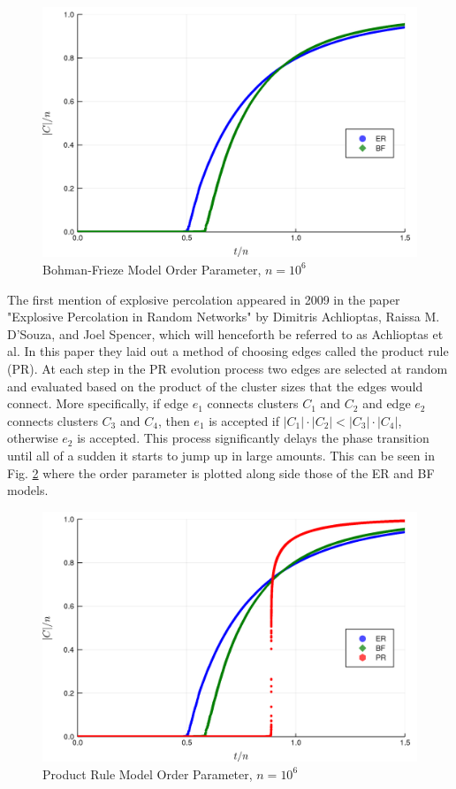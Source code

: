 \begin{figure}[H]
	\centering
	\includegraphics[width=350pt]{images/ER-BF-1e6-order-param.png}
	\caption{Bohman-Frieze Model Order Parameter, $n = 10^6$}
	\label{fig:ER_BF_transition}
\end{figure}

The first mention of explosive percolation appeared in 2009 in the paper "Explosive Percolation in Random Networks" \cite{20090313} by Dimitris Achlioptas, Raissa M. D’Souza, and Joel Spencer, which will henceforth be referred to as Achlioptas et al.
In this paper they laid out a method of choosing edges called the product rule (PR).
At each step in the PR evolution process two edges are selected at random and evaluated based on the product of the cluster sizes that the edges would connect.
More specifically, if edge $e_1$ connects clusters $C_1$ and $C_2$ and edge $e_2$ connects clusters $C_3$ and $C_4$, then $e_1$ is accepted if $|C_1| \cdot |C_2| < |C_3| \cdot |C_4|$, otherwise $e_2$ is accepted.
This process significantly delays the phase transition until all of a sudden it starts to jump up in large amounts.
This can be seen in Fig. \ref{fig:ER_BF_PR_transition} where the order parameter is plotted along side those of the ER and BF models.

\begin{figure}[H]
	\centering
	\includegraphics[width=350pt]{images/ER-BF-PR-1e6-order-param.png}
	\caption{Product Rule Model Order Parameter, $n = 10^6$}
	\label{fig:ER_BF_PR_transition}
\end{figure}
